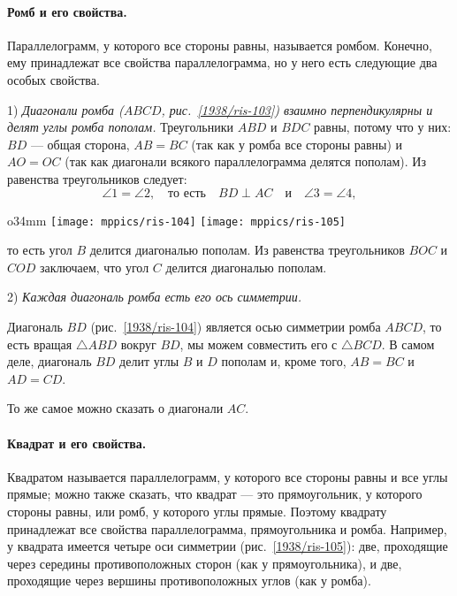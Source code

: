 \paragraph{Ромб и его свойства.}\label{1938/93}
Параллелограмм, у которого все стороны равны, называется ромбом.
Конечно, ему принадлежат все свойства параллелограмма, но у него есть следующие два особых свойства.

1) \emph{Диагонали ромба \emph{($ABCD$, рис.~\ref{1938/ris-103})} взаимно перпендикулярны и делят углы ромба пополам.}
Треугольники $ABD$ и $BDC$ равны, потому что у них:
$BD$ — общая сторона, $AB=BC$ (так как у ромба все стороны равны) и $AO=OC$ (так как диагонали всякого параллелограмма делятся пополам).
Из равенства треугольников следует:
\[\angle 1 =\angle 2,
\quad
\text{то есть}
\quad
BD\perp AC
\quad
\text{и}
\quad
\angle 3 =\angle 4,
\]

\begin{wrapfigure}[20]{o}{34mm}
\vskip-6mm
\centering
\texttt{[image: mppics/ris-104]}
\label{1938/ris-104}
\bigskip
\texttt{[image: mppics/ris-105]}
\caption{}\label{1938/ris-105}
\end{wrapfigure}

\noindent
то есть угол $B$ делится диагональю пополам.
Из равенства треугольников $BOC$ и $COD$ заключаем, что угол $C$ делится диагональю пополам.

2) \emph{Каждая диагональ ромба есть его ось симметрии.}


Диагональ $BD$ (рис.~\ref{1938/ris-104}) является осью симметрии ромба $ABCD$,
то есть вращая $\triangle ABD$ вокруг $BD$, мы можем совместить его с $\triangle BCD$.
В самом деле, диагональ $BD$ делит углы $B$ и $D$ пополам и, кроме того, $AB=BC$ и $AD=CD$.

То же самое можно сказать о диагонали $AC$.

\paragraph{Квадрат и его свойства.}\label{1938/94}
Квадратом называется параллелограмм, у которого все стороны равны и все углы прямые;
можно также сказать, что квадрат — это прямоугольник, у которого стороны равны, или ромб, у которого углы прямые.
Поэтому квадрату принадлежат все свойства параллелограмма, прямоугольника и ромба.
Например, у квадрата имеется четыре оси симметрии (рис.~\ref{1938/ris-105}):
две, проходящие через середины противоположных сторон (как у прямоугольника), и две, проходящие через вершины противоположных углов (как у ромба).

